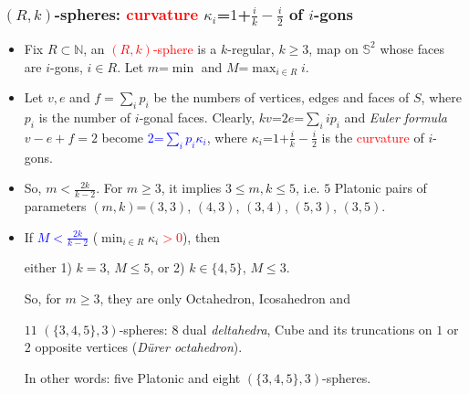 \documentclass{beamer}
\begin{document}
\begin{frame}\frametitle{$(R,k)$-spheres:  
 \textcolor{red}{curvature} $\kappa_i$=$1$+$\frac{i}{k}-\frac{i}{2}$
of  $i$-gons}
\vspace{-2mm}
\begin{itemize}
\item Fix $R\subset \mathbb{N}$, an  \textcolor{red}{$(R,k)$-sphere}  is 
a $k$-regular, $k\ge 3$,  map on 
$\mathbb{S}^2$ 
whose faces are $i$-gons,
$i\in R$. Let $m$=$\min$
 and $M$=$\max_{i\in R}i$.
 
\item Let $v,e$ and $f=\sum_{i}p_i$ be the numbers of 
vertices, edges and faces of $S$, where $p_i$ is the number 
of $i$-gonal faces. 
Clearly,
$kv$=$2e$=$\sum_{i}ip_i$ and  
 {\em Euler formula $v-e+f=2$}
become   \textcolor{blue}{$2$=$\sum_{i}p_i\kappa_i$}, where 
$\kappa_i$=$1$+$\frac{i}{k}-\frac{i}{2}$ is 
the \textcolor{red}{curvature} of $i$-gons.



\item So, $m$$<$$\frac{2k}{k-2}$.
For $m$$\ge$$3$, 
 it implies $3\le m,k\le 5$,
i.e.  $5$ Platonic pairs of parameters
$(m,k)$=$(3,3)$, $(4,3)$, $(3,4)$, $(5,3)$, $(3,5)$.

\item If \textcolor{blue}{$M$$<$$\frac{2k}{k-2}$} ($\min_{i\in 
R}\kappa_i$\textcolor{red}{$>0$}),  then 

either  
1) $k=3$, $M\le5$,  or 2) $k\in\{4,5\}$,  $M\le3$.

So, for $m\ge 3$, they are only 
Octahedron, 
Icosahedron and 

$11$ $(\{3,4,5\},3)$-spheres: $8$ dual 
 {\em deltahedra}, Cube and its truncations on $1$ or $2$ 
opposite vertices ({\em D\"{u}rer octahedron}).

In other words: five Platonic  and eight $(\{3,4,5\},3)$-spheres.
\end{itemize}\end{frame}
\end{document}
